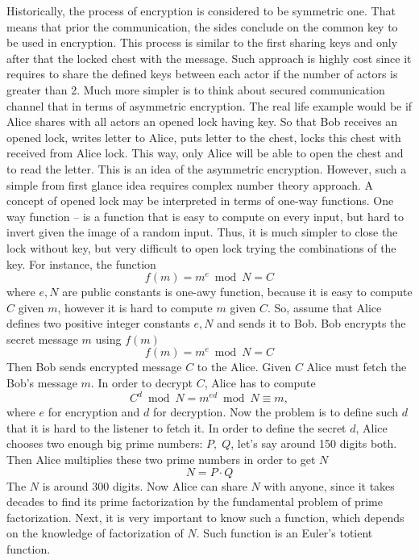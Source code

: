 Historically, the process of encryption is considered to be symmetric one.
That means that prior the communication, the sides conclude on the common key to be used in encryption.
This process is similar to the first sharing keys and only after that the locked chest with the message.
Such approach is highly cost since it requires to share the defined keys between each actor if the number of actors
is greater than 2.
Much more simpler is to think about secured communication channel that in terms of asymmetric encryption.
The real life example would be if Alice shares with all actors an opened lock having key.
So that Bob receives an opened lock, writes letter to Alice, puts letter to the chest, locks this chest with received
from Alice lock.
This way, only Alice will be able to open the chest and to read the letter.
This is an idea of the asymmetric encryption.
However, such a simple from first glance idea requires complex number theory approach.
A concept of opened lock may be interpreted in terms of one-way functions.
One way function -- is a function that is easy to compute on every input, but hard to invert given the image of
a random input.
Thus, it is much simpler to close the lock without key, but very difficult to open lock trying the combinations
of the key.
For instance, the function
\begin{equation*}
    f(m) = m^e \bmod N = C
\end{equation*}
where $e, N$ are public constants is one-awy function,
because it is easy to compute $C$ given $m$, however it is hard to compute $m$ given $C$.
So, assume that Alice defines two positive integer constants $e, N$ and sends it to Bob.
Bob encrypts the secret message $m$ using $f(m)$
\[
    f(m) = m^e \bmod N = C
\]
Then Bob sends encrypted message $C$ to the Alice.
Given $C$ Alice must fetch the Bob's message $m$.
In order to decrypt $C$, Alice has to compute
\[
    C^d \bmod N = m^{ed} \bmod N \equiv m,
\]
where $e$ for encryption and $d$ for decryption.
Now the problem is to define such $d$ that it is hard to the listener to fetch it.
In order to define the secret $d$, Alice chooses two enough big prime numbers: $P, \; Q$, let's say around 150 digits
both.
Then Alice multiplies these two prime numbers in order to get $N$
\[
    N = P \cdot Q
\]
The $N$ is around 300 digits.
Now Alice can share $N$ with anyone, since it takes decades to find its prime factorization by the fundamental problem
of prime factorization.
Next, it is very important to know such a function, which depends on the knowledge of factorization of $N$.
Such function is an Euler's totient function.
